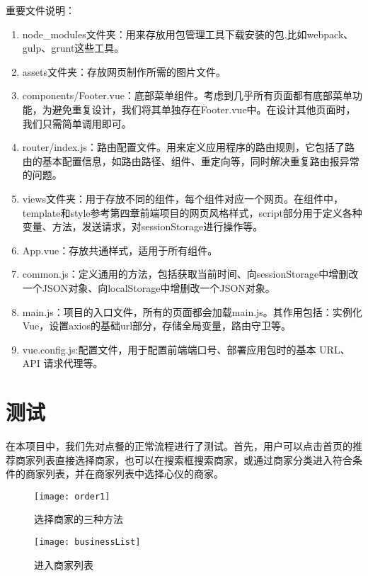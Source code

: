 重要文件说明：
\begin{enumerate}
    \item {node\_modules文件夹}：用来存放用包管理工具下载安装的包,比如webpack、gulp、grunt这些工具。
    \item {assets文件夹}：存放网页制作所需的图片文件。
    \item {components/Footer.vue}：底部菜单组件。考虑到几乎所有页面都有底部菜单功能，为避免重复设计，我们将其单独存在Footer.vue中。在设计其他页面时，我们只需简单调用即可。
    \item {router/index.js}：路由配置文件。用来定义应用程序的路由规则，它包括了路由的基本配置信息，如路由路径、组件、重定向等，同时解决重复路由报异常的问题。
    \item {views文件夹}：用于存放不同的组件，每个组件对应一个网页。在组件中，template和style参考第四章前端项目的网页风格样式，script部分用于定义各种变量、方法，发送请求，对sessionStorage进行操作等。
    \item {App.vue}：存放共通样式，适用于所有组件。
    \item {common.js}：定义通用的方法，包括获取当前时间、向sessionStorage中增删改一个JSON对象、向localStorage中增删改一个JSON对象。
    \item {main.js}：项目的入口文件，所有的页面都会加载main.js。其作用包括：实例化Vue，设置axios的基础url部分，存储全局变量，路由守卫等。
    \item {vue.config.js}:配置文件，用于配置前端端口号、部署应用包时的基本 URL、API 请求代理等。
\end{enumerate}

\section{测试}
在本项目中，我们先对点餐的正常流程进行了测试。首先，用户可以点击首页的推荐商家列表直接选择商家，也可以在搜索框搜索商家，或通过商家分类进入符合条件的商家列表，并在商家列表中选择心仪的商家。
\begin{figure}[htbp]
    \centering
    \begin{minipage}{0.4\textwidth}
        \centering
        \texttt{[image: order1]}
        \caption{选择商家的三种方法}\label{fig:order1}
    \end{minipage}
    \begin{minipage}{0.4\textwidth}
        \centering
        \texttt{[image: businessList]}
        \caption{进入商家列表}\label{fig:businessList}
    \end{minipage}
    \vspace{\baselineskip}
\end{figure}

